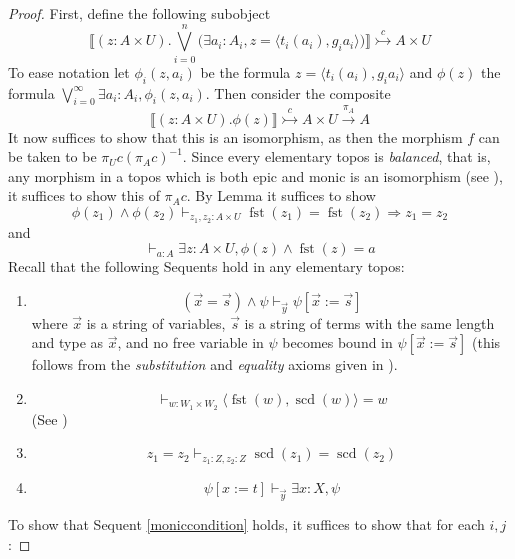 \documentclass{birkjour}
\theoremstyle{plain}
\theoremstyle{definition}
\begin{document}
\begin{proof}
	First, define the following subobject
	\[\llbracket (z: A \times U) . \bigvee_{i = 0}^n\big(\exists a_i : A_i, z = \langle t_i(a_i), g_ia_i \rangle \big)\rrbracket \stackrel{c}{\rightarrowtail} A \times U\]
	To ease notation let $\phi_i(z,a_i)$ be the formula $z = \langle t_i(a_i),g_ia_i\rangle$ and $\phi(z)$ the formula $\bigvee_{i = 0}^\infty \exists a_i:A_i, \phi_i(z,a_i)$.
	Then consider the composite
	\[\llbracket (z: A \times U) .\phi(z)\rrbracket \stackrel{c}{\rightarrowtail} A \times U \stackrel{\pi_A}{\to} A\]
	It now suffices to show that this is an isomorphism, as then the morphism $f$ can be taken to be $\pi_U c (\pi_A c)^{-1}$. Since every elementary topos is \emph{balanced}, that is, any morphism in a topos which is both epic and monic is an isomorphism (see \cite[\S IV.1 Prop 2]{MM}), it suffices to show this of $\pi_A c$. By Lemma \cite[3.4.2]{troiani} it suffices to show
	\begin{equation}
		\label{moniccondition}
		\phi(z_1) \wedge \phi(z_2) \vdash_{z_1,z_2 : A \times U} \operatorname{fst}(z_1) = \operatorname{fst}(z_2) \Rightarrow z_1 = z_2
	\end{equation}
	and
	\begin{equation}
		\label{epiccondition}
		\vdash_{a:A} \exists z: A \times U, \phi(z) \wedge \operatorname{fst}(z) = a
	\end{equation}
	Recall that the following Sequents hold in any elementary topos:
	\begin{enumerate}
		\item \label{substitutionlemma} \[(\vec{x} = \vec{s}) \wedge \psi \vdash_{\vec{y}} \psi[\vec{x} := \vec{s}]\]
		where $\vec{x}$ is a string of variables, $\vec{s}$ is a string of terms with the same length and type as $\vec{x}$, and no free variable in $\psi$ becomes bound in $\psi[\vec{x} := \vec{s}]$ (this follows from the \emph{substitution} and \emph{equality} axioms given in \cite[\S4.1 Definition 1.3.1]{Johnstone}).
		\item \label{producttypes} \[\vdash_{w:W_1 \times W_2}\langle \operatorname{fst}(w), \operatorname{scd}(w)\rangle = w\]
		(See \cite[\S D4.1 Lemma 4.1.6]{Johnstone})
		\item \label{application}
		\[z_1 = z_2 \vdash_{z_1 : Z, z_2 : Z} \operatorname{scd}(z_1) = \operatorname{scd}(z_2)\]
		\item \label{witness} 
		\[\psi[x := t] \vdash_{\vec{y}} \exists x: X, \psi\]
	\end{enumerate}
	To show that Sequent \ref{moniccondition} holds, it suffices to show that for each $i,j$:

\end{proof}
\end{document}
